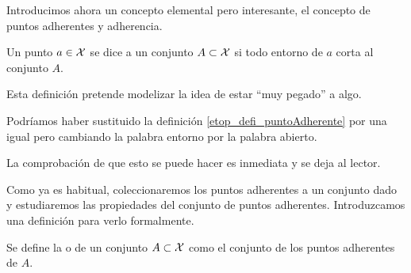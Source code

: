 Introducimos ahora un concepto elemental pero interesante, el concepto de puntos adherentes y adherencia.
\begin{defi}
	\label{etop_defi_puntoAdherente}
	Un punto $a\in\mathcal{X}$ se dice  a un conjunto $A\subset\mathcal{X}$ si todo entorno de $a$ corta al conjunto $A$.
	
	Esta definición pretende modelizar la idea de estar ``muy pegado'' a algo.
\end{defi}

\begin{obs}
	\label{etop_defi_equivalente}
	Podríamos haber sustituido la definición \ref{etop_defi_puntoAdherente} por una igual pero cambiando la palabra entorno por la palabra abierto.
	
	La comprobación de que esto se puede hacer es inmediata y se deja al lector.
\end{obs}
Como ya es habitual, coleccionaremos los puntos adherentes a un conjunto dado y estudiaremos las propiedades del conjunto de puntos adherentes. Introduzcamos una definición para verlo formalmente.
\begin{defi}[Adherencia]
	\label{etop_defi_adherencia}
	Se define la  o  de un conjunto $A\subset\mathcal{X}$ como el conjunto de los puntos adherentes de $A$.
\end{defi}

